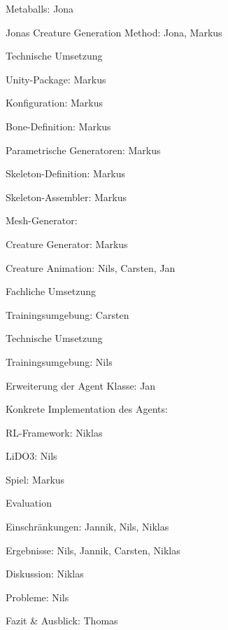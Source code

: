 \begin{thallok}
\begin{thallok}
\begin{thallok}
\begin{thallok}
					\item Metaballs: Jona
					\item Jonas Creature Generation Method: Jona, Markus
				\end{thallok}
			\item Technische Umsetzung
				\begin{thallok}
					\item Unity-Package: Markus
					\item Konfiguration: Markus
					\item Bone-Definition: Markus
					\item Parametrische Generatoren: Markus
					\item Skeleton-Definition: Markus
					\item Skeleton-Assembler: Markus
					\item Mesh-Generator:
					\item Creature Generator: Markus
				\end{thallok}
		\end{thallok}
		\item Creature Animation: Nils, Carsten, Jan
		\begin{thallok}
			\item Fachliche Umsetzung
				\begin{thallok}
					\item Trainingsumgebung: Carsten
				\end{thallok}
			\item Technische Umsetzung
				\begin{thallok}
					\item Trainingsumgebung: Nils
					\item Erweiterung der Agent Klasse: Jan
					\item Konkrete Implementation des Agents:
					\item RL-Framework: Niklas
					\item LiDO3: Nils
				\end{thallok}
		\end{thallok}
		\item Spiel: Markus
	\end{thallok}
	\item Evaluation
	\begin{thallok}
		\item Einschränkungen: Jannik, Nils, Niklas
		\item Ergebnisse: Nils, Jannik, Carsten, Niklas
		\item Diskussion: Niklas
		\item Probleme: Nils
	\end{thallok}
	\item Fazit \& Ausblick: Thomas
\end{thallok}

